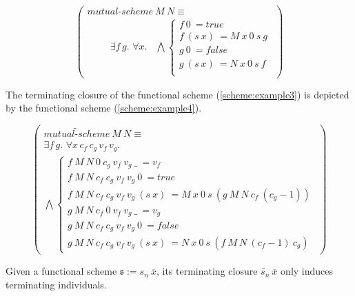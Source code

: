 \begin{example}
\begin{equation}
\left(\begin{array}{l}
mutual\textrm{-}scheme\ M\ N \equiv \\
\quad \quad \begin{array}{c}
\exists f\,g.\,\, \forall x. \phantom{,}
\end{array}
\bigwedge \left\{
	\begin{array}{l}
			f\ 0\ = true \\
			f\ (s\ x)\ = M\ x\ 0\ s\ g\\
			g\ 0\ = false \\
			g\ (s\ x)\ = N\ x\ 0\ s\ f\\
	\end{array}
  \right.
\end{array}\right)
\label{scheme:example3}
\end{equation}

The terminating closure of the functional scheme (\ref{scheme:example3}) is depicted by the functional scheme (\ref{scheme:example4}).

\begin{equation}
\left(\begin{array}{l}
\widetilde{mutual\textrm{-}scheme}\ M\ N \equiv \\
\exists f\,g.\,\, \forall x\,c_f\,c_g\,v_f\,v_g. \phantom{,}\\
\bigwedge \left\{
	\begin{array}{l}
			f\ M\ N\ 0\ c_g\ v_f\ v_g\ \_\ = v_f \\
			f\ M\ N\ c_f\ c_g\ v_f\ v_g\ 0\ = true \\
			f\ M\ N\ c_f\ c_g\ v_f\ v_g\ (s\ x)\ = M\ x\ 0\ s\ (g\ M\ N\ c_f\ (c_g-1))\\
			g\ M\ N\ c_f\ 0\ v_f\ v_g\ \_\ = v_g \\
			g\ M\ N\ c_f\ c_g\ v_f\ v_g\ 0\ = false \\
			g\ M\ N\ c_f\ c_g\ v_f\ v_g\ (s\ x)\ = N\ x\ 0\ s\ (f\ M\ N\ (c_f-1)\ c_g)
	\end{array}
  \right.
\end{array}\right)
\label{scheme:example4}
\end{equation}

\end{example}

\begin{thm}
  \label{totality-terminating-closure}
  Given a functional scheme $\mathfrak{s} := s_n\ \overline{x}$, its terminating closure $\widetilde{s_n}\ \overline{x}$ only induces terminating individuals.
\end{thm}

